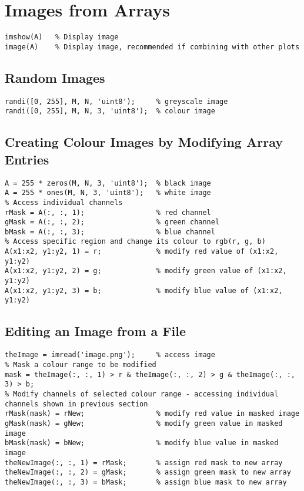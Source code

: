 \documentclass{article}
\begin{document}
\section*{Images from Arrays}
\begin{lstlisting}
imshow(A)   % Display image
image(A)    % Display image, recommended if combining with other plots
\end{lstlisting}
\subsection*{Random Images}
\begin{lstlisting}
randi([0, 255], M, N, 'uint8');     % greyscale image
randi([0, 255], M, N, 3, 'uint8');  % colour image
\end{lstlisting}
\subsection*{Creating Colour Images by Modifying Array Entries}
\begin{lstlisting}
A = 255 * zeros(M, N, 3, 'uint8');  % black image
A = 255 * ones(M, N, 3, 'uint8');   % white image
% Access individual channels
rMask = A(:, :, 1);                 % red channel
gMask = A(:, :, 2);                 % green channel
bMask = A(:, :, 3);                 % blue channel
% Access specific region and change its colour to rgb(r, g, b)
A(x1:x2, y1:y2, 1) = r;             % modify red value of (x1:x2, y1:y2)
A(x1:x2, y1:y2, 2) = g;             % modify green value of (x1:x2, y1:y2)
A(x1:x2, y1:y2, 3) = b;             % modify blue value of (x1:x2, y1:y2)
\end{lstlisting}
\subsection*{Editing an Image from a File}
\begin{lstlisting}
theImage = imread('image.png');     % access image 
% Mask a colour range to be modified
mask = theImage(:, :, 1) > r & theImage(:, :, 2) > g & theImage(:, :, 3) > b;
% Modify channels of selected colour range - accessing individual channels shown in previous section
rMask(mask) = rNew;                 % modify red value in masked image
gMask(mask) = gNew;                 % modify green value in masked image
bMask(mask) = bNew;                 % modify blue value in masked image
theNewImage(:, :, 1) = rMask;       % assign red mask to new array 
theNewImage(:, :, 2) = gMask;       % assign green mask to new array
theNewImage(:, :, 3) = bMask;       % assign blue mask to new array
\end{lstlisting}
\end{document}
